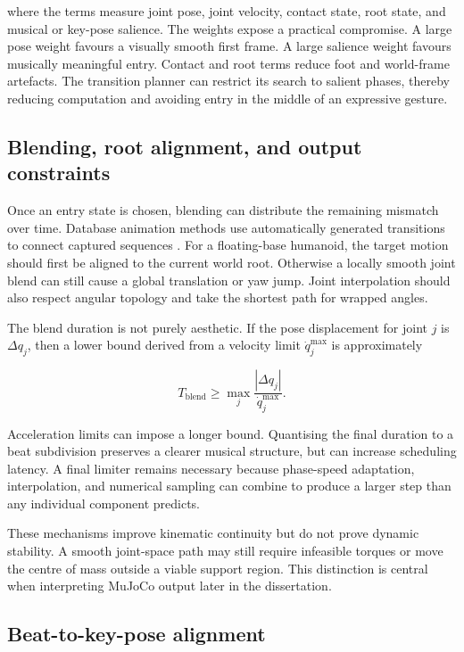 where the terms measure joint pose, joint velocity, contact state, root state,
and musical or key-pose salience. The weights expose a practical compromise. A
large pose weight favours a visually smooth first frame. A large salience weight
favours musically meaningful entry. Contact and root terms reduce foot and
world-frame artefacts. The transition planner can restrict its search to
salient phases, thereby reducing computation and avoiding entry in the middle
of an expressive gesture.

\subsection{Blending, root alignment, and output constraints}
\label{subsec:lit_blending}

Once an entry state is chosen, blending can distribute the remaining mismatch
over time. Database animation methods use automatically generated transitions
to connect captured sequences \cite{kovar2023motion}. For a floating-base
humanoid, the target motion should first be aligned to the current world root.
Otherwise a locally smooth joint blend can still cause a global translation or
yaw jump. Joint interpolation should also respect angular topology and take the
shortest path for wrapped angles.

The blend duration is not purely aesthetic. If the pose displacement for joint
$j$ is $\Delta q_j$, then a lower bound derived from a velocity limit
$\dot{q}^{\max}_j$ is approximately

\begin{equation}
    T_{\mathrm{blend}}
    \geq
    \max_j \frac{|\Delta q_j|}{\dot{q}^{\max}_j}.
\end{equation}

Acceleration limits can impose a longer bound. Quantising the final duration to
a beat subdivision preserves a clearer musical structure, but can increase
scheduling latency. A final limiter remains necessary because phase-speed
adaptation, interpolation, and numerical sampling can combine to produce a
larger step than any individual component predicts.

These mechanisms improve kinematic continuity but do not prove dynamic
stability. A smooth joint-space path may still require infeasible torques or
move the centre of mass outside a viable support region. This distinction is
central when interpreting MuJoCo output later in the dissertation.

\subsection{Beat-to-key-pose alignment}
\label{subsec:lit_beat_keypose}

